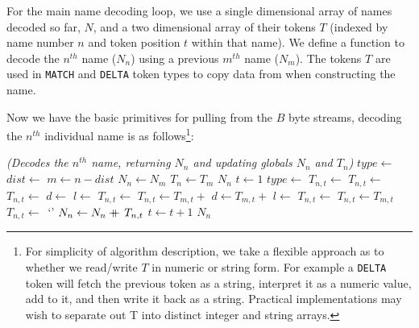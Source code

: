\documentclass[a4paper]{article}
\begin{document}
For the main name decoding loop, we use a single dimensional array of
names decoded so far, $N$, and a two dimensional array of their tokens
$T$ (indexed by name number $n$ and token position $t$ within that
name).  We define a function to decode the $n^{th}$ name ($N_n$) using
a previous $m^{th}$ name ($N_m$).  The tokens $T$ are used in
\texttt{MATCH} and \texttt{DELTA} token types to copy data from when
constructing the name.

Now we have the basic primitives for pulling from the $B$ byte
streams, decoding the $n^{th}$ individual name is as
follows\footnote{For simplicity of algorithm description, we take a
  flexible approach as to whether we read/write $T$ in numeric or
  string form.  For example a \texttt{DELTA} token will fetch the
  previous token as a string, interpret it as a numeric value, add to
  it, and then write it back as a string.  Practical implementations
  may wish to separate out T into distinct integer and string
  arrays.}:


\begin{algorithmic}[1]
\Statex
\Statex \textit{(Decodes the $n^{th}$ name, returning $N_n$ and updating globals $N_n$ and $T_n$)}
  \State $type \gets$ 
  \State $dist \gets$ 
  \State $m \gets n-dist$
    \State $N_n \gets N_m$
    \State $T_n \gets T_m$ 
    \State \Return $N_n$
  \EndIf
  \Statex
  \State $t \gets 1$ 
  \Repeat
    \State $type \gets$ 
      \State $T_{n,t} \gets$ 
      \State $T_{n,t} \gets$ 
      \State $T_{n,t} \gets$ 
      \State $d \gets$ 
      \State $l \gets$ 
      \State $T_{n,t} \gets$ 
      \State $T_{n,t} \gets T_{m,t} + $ 
      \State $d \gets T_{m,t} + $ 
      \State $l \gets$  
      \State $T_{n,t} \gets$ 
      \State $T_{n,t} \gets T_{m,t}$
    \Else
      \State $T_{n,t} \gets$\ `'
    \EndIf
    \State $N_n \gets N_n \mathbin{+\mkern-10mu+\,} T_{n,t}$
    \State $t \gets t+1$
  \State \Return $N_n$
\EndFunction
\end{algorithmic}
\end{document}
